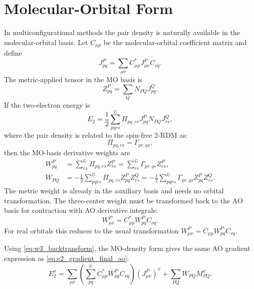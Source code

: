 \documentclass[aip,preprint]{revtex4-1}
\newcommand{\pert}{x}
\begin{document}
\section{Molecular-Orbital Form}

In multiconfigurational methods the pair density is naturally available in the
molecular-orbital basis.  Let $C_{\mu p}$ be the molecular-orbital coefficient
matrix and define
\begin{equation}
J^P_{pq}
=
\sum_{\mu\nu} C^*_{\mu p} J^P_{\mu\nu} C_{\nu q}.
\label{eq:j_mo}
\end{equation}
The metric-applied tensor in the MO basis is
\begin{equation}
Z^P_{pq}
=\sum_{Q}
N_{PQ}J^Q_{pq}.
\label{eq:z_mo}
\end{equation}
If the two-electron energy is
\begin{equation}
E_2
=
\frac{1}{2}
\sum_{pqrs}^\mathbb{G}\Pi_{pq,rs}
J^P_{pq}N_{PQ}J^Q_{rs},
\label{eq:e2_mo}
\end{equation}
where the pair density is related to the spin-free 2-RDM as:
\begin{equation}
\Pi_{pq,rs} = \Gamma_{pr,qs},
\end{equation}
then the MO-basis derivative weights are
\begin{align}
W^P_{pq}
&=
\sum_{rs}^\mathbb{G} \Pi_{pq,rs} Z^P_{rs} = \sum_{rs}^\mathbb{G}  \Gamma_{pr,qs} Z^P_{rs},
\label{eq:w3_mo}\\
W_{PQ}
&=
-\frac{1}{2}
\sum_{pqrs}^\mathbb{G}
\Pi_{pq,rs}Z^P_{pq}Z^Q_{rs}
=
-\frac{1}{2}
\sum_{pqrs}^\mathbb{G}
\Gamma_{pr,qs} Z^P_{pq} Z^Q_{rs}.
\label{eq:w2_mo}
\end{align}
The metric weight is already in the auxiliary basis and needs no orbital
transformation.  The three-center weight must be transformed back to the AO
basis for contraction with AO derivative integrals:
\begin{equation}
W^P_{\mu\nu}
=
C^*_{\mu p} W^P_{pq} C_{\nu q}.
\label{eq:w3_backtransform}
\end{equation}
For real orbitals this reduces to the usual transformation
$W^P_{\mu\nu}=C_{\mu p}W^P_{pq}C_{\nu q}$.

Using \cref{eq:w3_backtransform}, the MO-density form gives the same AO
gradient expression as \cref{eq:e2_gradient_final_ao}:
\begin{equation}
E_2^{\pert}
=
\sum_{\mu \nu}\left(\sum_{pq}^\mathbb{G}C^*_{\mu p} W^P_{pq} C_{\nu q}\right)(J^{P}_{\mu\nu})^{\pert}
+
\sum_{PQ}
W_{PQ}M^{\pert}_{PQ}.
\label{eq:e2_gradient_mo_to_ao}
\end{equation}
\end{document}
